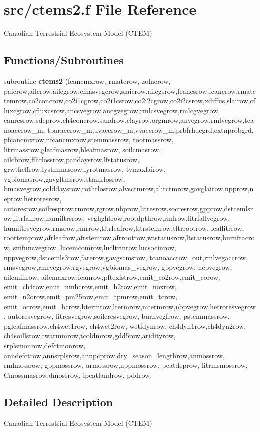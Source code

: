 \hypertarget{ctems2_8f}{}\section{src/ctems2.f File Reference}
\label{ctems2_8f}


Canadian Terrestrial Ecosystem Model (C\+T\+E\+M)  


\subsection*{Functions/\+Subroutines}
\begin{DoxyCompactItemize}
\item 
\hypertarget{ctems2_8f_a2ead77d4e4c1c98dba5fa0ea0ba82d5e}{}subroutine {\bfseries ctems2} (fcancmxrow, rmatcrow, zolncrow, paicrow,ailcrow,ailcgrow,cmasvegcrow,slaicrow,ailcgsrow,fcancsrow,fcancrow,rmatctemrow,co2concrow,co2i1cgrow,co2i1csrow,co2i2cgrow,co2i2csrow,xdiffus,slairow,cfluxcgrow,cfluxcsrow,ancsvegrow,ancgvegrow,rmlcsvegrow,rmlcgvegrow, canresrow,sdeprow,ch4concrow,sandrow,clayrow,orgmrow,anvegrow,rmlvegrow,tcanoaccrow\+\_\+m, tbaraccrow\+\_\+m,uvaccrow\+\_\+m,vvaccrow\+\_\+m,prbfrhucgrd,extnprobgrd, pfcancmxrow,nfcancmxrow,stemmassrow, rootmassrow, litrmassrow,gleafmasrow,bleafmasrow, soilcmasrow, ailcbrow,flhrlossrow,pandaysrow,lfstatusrow, grwtheffrow,lystmmasrow,lyrotmasrow, tymaxlairow, vgbiomasrow,gavgltmsrow,stmhrlosrow, bmasvegrow,colddaysrow,rothrlosrow,alvsctmrow,alirctmrow,gavglairow,npprow,neprow,hetroresrow, autoresrow,soilresprow,rmrow,rgrow,nbprow,litresrow,socresrow,gpprow,dstcemlsrow,litrfallrow,humiftrsrow, veghghtrow,rootdpthrow,rmlrow,litrfallvegrow, humiftrsvegrow,rmsrow,rmrrow,tltrleafrow,tltrstemrow,tltrrootrow, leaflitrrow, roottemprow,afrleafrow,afrstemrow,afrrootrow,wtstatusrow,ltstatusrow,burnfracrow, smfuncvegrow, lucemcomrow,lucltrinrow,lucsocinrow, nppvegrow,dstcemls3row,farerow,gavgscmsrow, tcanoaccrow\+\_\+out,rmlvegaccrow, rmsvegrow,rmrvegrow,rgvegrow,vgbiomas\+\_\+vegrow, gppvegrow, nepvegrow, ailcminrow, ailcmaxrow,fcanrow,pftexistrow,emit\+\_\+co2row,emit\+\_\+corow, emit\+\_\+ch4row,emit\+\_\+nmhcrow,emit\+\_\+h2row,emit\+\_\+noxrow, emit\+\_\+n2orow,emit\+\_\+pm25row,emit\+\_\+tpmrow,emit\+\_\+tcrow, emit\+\_\+ocrow,emit\+\_\+bcrow,btermrow,ltermrow,mtermrow,nbpvegrow,hetroresvegrow, autoresvegrow, litresvegrow,soilcresvegrow, burnvegfrow, pstemmassrow, pgleafmassrow,ch4wet1row, ch4wet2row, wetfdynrow, ch4dyn1row,ch4dyn2row, ch4soillsrow,twarmmrow,tcoldmrow,gdd5row,aridityrow, srplsmonrow,defctmonrow, anndefctrow,annsrplsrow,annpcprow,dry\+\_\+season\+\_\+lengthrow,anmossrow, rmlmossrow, gppmossrow, armossrow,nppmossrow, peatdeprow, litrmsmossrow, Cmossmasrow,dmossrow, ipeatlandrow, pddrow,\label{ctems2_8f_a2ead77d4e4c1c98dba5fa0ea0ba82d5e}

\end{DoxyCompactItemize}


\subsection{Detailed Description}
Canadian Terrestrial Ecosystem Model (C\+T\+E\+M) 

